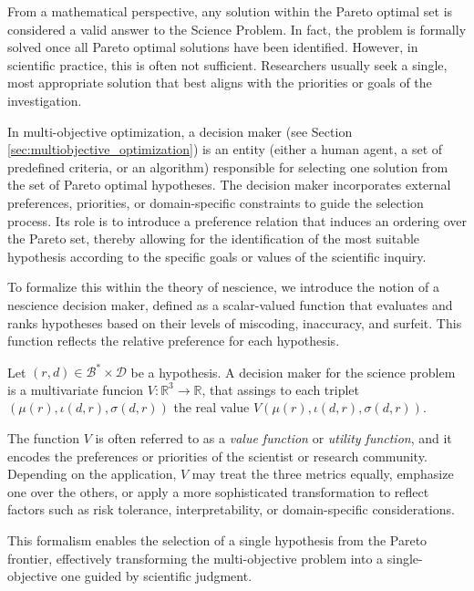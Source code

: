 From a mathematical perspective, any solution within the Pareto optimal set is considered a valid answer to the Science Problem. In fact, the problem is formally solved once all Pareto optimal solutions have been identified. However, in scientific practice, this is often not sufficient. Researchers usually seek a single, most appropriate solution that best aligns with the priorities or goals of the investigation.

In multi-objective optimization, a decision maker (see Section \ref{sec:multiobjective_optimization}) is an entity (either a human agent, a set of predefined criteria, or an algorithm) responsible for selecting one solution from the set of Pareto optimal hypotheses. The decision maker incorporates external preferences, priorities, or domain-specific constraints to guide the selection process. Its role is to introduce a preference relation that induces an ordering over the Pareto set, thereby allowing for the identification of the most suitable hypothesis according to the specific goals or values of the scientific inquiry.

To formalize this within the theory of nescience, we introduce the notion of a nescience decision maker, defined as a scalar-valued function that evaluates and ranks hypotheses based on their levels of miscoding, inaccuracy, and surfeit. This function reflects the relative preference for each hypothesis.

\begin{definition}
Let $(r, d) \in \mathcal{B}^\ast \times \mathcal{D}$ be a hypothesis. A decision maker for the science problem is a multivariate funcion $V : \mathbb{R}^3 \rightarrow \mathbb{R}$, that assings to each triplet $\left( \mu(r), \iota(d, r), \sigma(d, r) \right)$ the real value $V\left( \mu(r), \iota(d, r), \sigma(d, r) \right)$. 
\end{definition}

The function $V$ is often referred to as a \emph{value function} or \emph{utility function}, and it encodes the preferences or priorities of the scientist or research community. Depending on the application, $V$ may treat the three metrics equally, emphasize one over the others, or apply a more sophisticated transformation to reflect factors such as risk tolerance, interpretability, or domain-specific considerations.

This formalism enables the selection of a single hypothesis from the Pareto frontier, effectively transforming the multi-objective problem into a single-objective one guided by scientific judgment.

